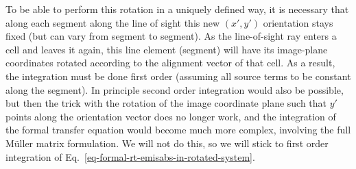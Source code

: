 \documentclass{report}
\begin{document}
To be able to perform this rotation in a uniquely defined way, it is
necessary that along each segment along the line of sight this new $(x',y')$
orientation stays fixed (but can vary from segment to segment). As the
line-of-sight ray enters a cell and leaves it again, this line element
(segment) will have its image-plane coordinates rotated according to the
alignment vector of that cell. As a result, the integration must be done
first order (assuming all source terms to be constant along the segment).
In principle second order integration would also be possible, but then the
trick with the rotation of the image coordinate plane such that $y'$ points
along the orientation vector does no longer work, and the integration of the
formal transfer equation would become much more complex, involving the full
M\"uller matrix formulation. We will not do this, so we will stick to first
order integration of Eq.~\ref{eq-formal-rt-emisabs-in-rotated-system}.
\end{document}
